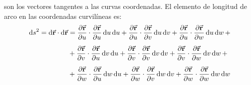 \documentclass[hidelinks,12pt]{article}
\begin{document}
son los vectores tangentes a las curvas coordenadas. El elemento de longitud de arco en las coordenadas curvilíneas es:
\begin{align}
\begin{aligned}
\dd{s}^{2} = \dd{\va{r}} \cdot \dd{\va{r}} &= \pdv{\va{r}}{u} \cdot \pdv{\va{r}}{u} \dd{u} \dd{u} + \pdv{\va{r}}{u} \cdot \pdv{\va{r}}{v} \dd{u} \dd{v} + \pdv{\va{r}}{u} \cdot \pdv{\va{r}}{w} \dd{u} \dd{w} + \\[0.5em]
&+ \pdv{\va{r}}{v} \cdot \pdv{\va{r}}{u} \dd{v} \dd{u} + \pdv{\va{r}}{v} \cdot \pdv{\va{r}}{v} \dd{v} \dd{v} + \pdv{\va{r}}{v} \cdot \pdv{\va{r}}{w} \dd{v} \dd{w} + \\[0.5em]
&+ \pdv{\va{r}}{w} \cdot \pdv{\va{r}}{u} \dd{w} \dd{u} + \pdv{\va{r}}{w} \cdot \pdv{\va{r}}{v} \dd{w} \dd{v} + \pdv{\va{r}}{w} \cdot \pdv{\va{r}}{w} \dd{w} \dd{w}
\end{aligned}
\label{eq:ecuacion_01_03_12}
\end{align}
\end{document}
